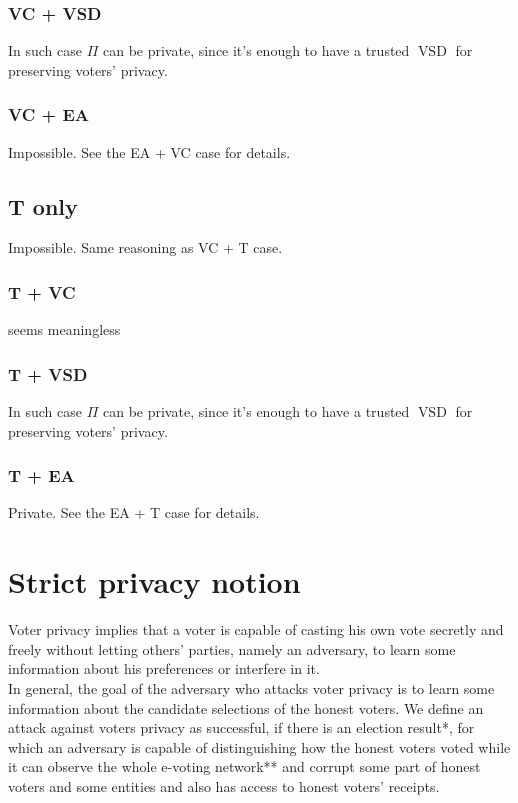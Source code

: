 \documentclass[12pt]{article}
\DeclareMathOperator{\vsd}{VSD}
\begin{document}
\subsubsection{VC + VSD}
    In such case $\Pi$ can be private, since it's enough to have a trusted $\vsd$ for preserving voters' privacy. 
\subsubsection{VC + EA}
 Impossible. See the EA + VC  case for details. 
\subsection{T only}
  Impossible. Same reasoning as VC + T case.
\subsubsection{T + VC}
   seems meaningless
\subsubsection{T + VSD}
    In such case $\Pi$ can be private, since it's enough to have a trusted $\vsd$ for preserving voters' privacy. 
\subsubsection{T + EA}
   Private. See the EA + T case for details. 
%
\section{Strict privacy notion}
Voter privacy implies that a voter is capable of casting his own vote secretly and freely without letting others' parties, namely an adversary, to learn some information about his preferences or interfere in it.\\

In general, the goal of the adversary who attacks voter privacy is to learn some information about the candidate selections of the honest voters. We define an attack against voters privacy as successful, if there is an election result*, for which an adversary is capable of distinguishing how the honest voters voted while it can observe the whole e-voting network** and corrupt some part of honest voters and some entities and also has access to honest voters' receipts. \\
\end{document}
